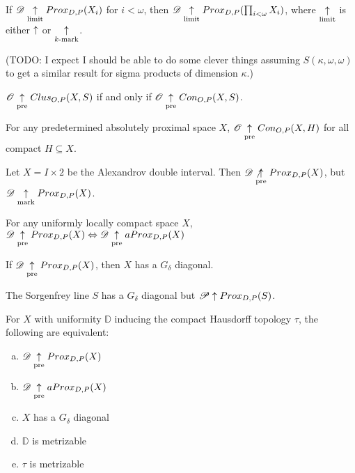 \begin{thm}
  If $\mathscr{D}\underset{\text{limit}}{\uparrow} Prox_{D,P}(X_i)$ for $i<\omega$, then
  $\mathscr{D}\underset{\text{limit}}{\uparrow} Prox_{D,P}(\prod_{i<\omega}X_i)$, where $\underset{\text{limit}}{\uparrow}$ is either
  $\uparrow$ or $\underset{k\text{-mark}}{\uparrow}$.
\end{thm}

(TODO: I expect I should be able to do some clever things
assuming $S(\kappa,\omega,\omega)$ to get a similar result for sigma
products of dimension $\kappa$.)

\begin{lem}
  $\mathscr{O}\underset{\text{pre}}{\uparrow}Clus_{O,P}(X,S)$ if and only if $\mathscr{O}\underset{\text{pre}}{\uparrow}Con_{O,P}(X,S)$.
\end{lem}

\begin{thm}
  For any predetermined absolutely proximal space $X$,
  $\mathscr{O}\underset{\text{pre}}{\uparrow} Con_{O,P}(X,H)$ for all compact $H\subseteq X$.
\end{thm}


\begin{ex}
  Let $X=I\times 2$ be the Alexandrov double interval. Then
  $\mathscr{D} \not\underset{\text{pre}}{\uparrow} Prox_{D,P}(X)$, but $\mathscr{D} \underset{\text{mark}}{\uparrow} Prox_{D,P}(X)$.
\end{ex}

\begin{thm}
  For any uniformly locally compact space $X$,
      $\mathscr{D}\underset{\text{pre}}{\uparrow} Prox_{D,P}(X) \Leftrightarrow \mathscr{D}\underset{\text{pre}}{\uparrow} aProx_{D,P}(X)$
\end{thm}

\begin{prop}
If $\mathscr{D} \underset{\text{pre}}{\uparrow} Prox_{D,P}(X)$, then $X$ has a $G_\delta$ diagonal.
\end{prop}


\begin{ex}
The Sorgenfrey line $S$ has a $G_\delta$ diagonal but $\mathscr{P}\uparrow Prox_{D,P}(S)$.
\end{ex}

\begin{cor}
  For $X$ with uniformity $\mathbb{D}$ inducing the compact Hausdorff topology
  $\tau$, the following are equivalent:
    \begin{enumerate}[(a)]
      \item $\mathscr{D} \underset{\text{pre}}{\uparrow} Prox_{D,P}(X)$
      \item $\mathscr{D} \underset{\text{pre}}{\uparrow} aProx_{D,P}(X)$
      \item $X$ has a $G_\delta$ diagonal
      \item $\mathbb{D}$ is metrizable
      \item $\tau$ is metrizable
    \end{enumerate}
\end{cor}


